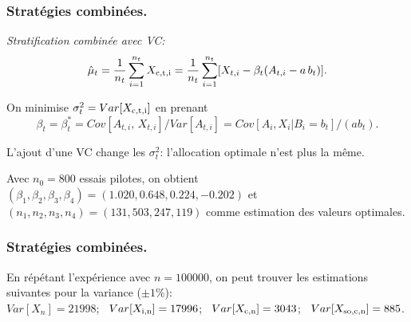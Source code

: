 \documentclass[t,usepdftitle=false]{beamer}
\begin{document}
\begin{frame}
	\frametitle{Stratégies combinées.}
	
	\emph{Stratification combinée avec VC:}\\
	$$ 
	{\hat\mu_t} = {1\over n_t} \sum_{i=1}^{n_t} X_{\rm{c},t,i} 
	= {1\over n_t} \sum_{i=1}^{n_t} 
	[X_{t,i} - \beta_t (A_{t,i} - a\,b_t)].
	$$
	
	\mbox{}
	
	On minimise ${\sigma_t^2} = Var[X_{\rm{c},t,i}]$ en prenant 
	\[
	\beta_t = {\beta_t^*} = Cov[A_{t,i},\, X_{t,i}] / Var[A_{t,i}]
	= Cov[A_i, X_i | B_i=b_t] / (a b_t).
	\]
	
	\mbox{}
	
	L'ajout d'une VC change les $\sigma_t^2$: l'allocation 
	optimale n'est plus la m\^eme.
	
	\mbox{}
	
	Avec $n_0=800$ essais pilotes, on obtient
	$(\beta_1,\beta_2, \beta_3, \beta_4) = (1.020, 0.648, 0.224, -0.202)$ 
	et $(n_1, n_2, n_3, n_4) = (131, 503, 247, 119)$ 
	comme estimation des valeurs optimales.
	
\end{frame}

\begin{frame}
	\frametitle{Stratégies combinées.}
	
	En répétant l'expérience avec ${n = 100000}$, on peut trouver les
	estimations suivantes pour la variance ($\pm 1\%$):\\
	$Var[X_{n}] = 21998$; \
	$Var[X_{\rm{i},n}] = 17996$; \
	$Var[X_{\rm{c},n}] = 3043$; \
	$Var[X_{\rm{s}o,\rm{c},n}] = 885$.
	
\end{frame}
\end{document}
